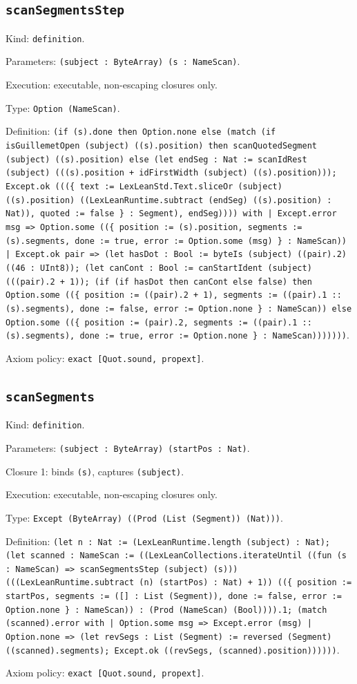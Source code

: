 \documentclass[11pt]{article}
\begin{document}
\subsection*{\texttt{scanSegmentsStep}}
\noindent Kind: \texttt{definition}.\par
\noindent Parameters: \texttt{(subject : ByteArray) (s : NameScan)}.\par
\noindent Execution: executable, non-escaping closures only.\par
\noindent Type: \texttt{Option (NameScan)}.\par
\noindent Definition: \texttt{(if (s).done then Option.none else (match (if isGuillemetOpen (subject) ((s).position) then scanQuotedSegment (subject) ((s).position) else (let endSeg : Nat := scanIdRest (subject) (((s).position + idFirstWidth (subject) ((s).position))); Except.ok (((\{ text := LexLeanStd.Text.sliceOr (subject) ((s).position) ((LexLeanRuntime.subtract (endSeg) ((s).position) : Nat)), quoted := false \} : Segment), endSeg)))) with | Except.error msg => Option.some ((\{ position := (s).position, segments := (s).segments, done := true, error := Option.some (msg) \} : NameScan)) | Except.ok pair => (let hasDot : Bool := byteIs (subject) ((pair).2) ((46 : UInt8)); (let canCont : Bool := canStartIdent (subject) (((pair).2 + 1)); (if (if hasDot then canCont else false) then Option.some ((\{ position := ((pair).2 + 1), segments := ((pair).1 :: (s).segments), done := false, error := Option.none \} : NameScan)) else Option.some ((\{ position := (pair).2, segments := ((pair).1 :: (s).segments), done := true, error := Option.none \} : NameScan)))))))}.\par
\noindent Axiom policy: \texttt{exact [Quot.sound, propext]}.\par
\subsection*{\texttt{scanSegments}}
\noindent Kind: \texttt{definition}.\par
\noindent Parameters: \texttt{(subject : ByteArray) (startPos : Nat)}.\par
\noindent Closure 1: binds \texttt{(s)}, captures \texttt{(subject)}.\par
\noindent Execution: executable, non-escaping closures only.\par
\noindent Type: \texttt{Except (ByteArray) ((Prod (List (Segment)) (Nat)))}.\par
\noindent Definition: \texttt{(let n : Nat := (LexLeanRuntime.length (subject) : Nat); (let scanned : NameScan := ((LexLeanCollections.iterateUntil ((fun (s : NameScan) => scanSegmentsStep (subject) (s))) (((LexLeanRuntime.subtract (n) (startPos) : Nat) + 1)) ((\{ position := startPos, segments := ([] : List (Segment)), done := false, error := Option.none \} : NameScan)) : (Prod (NameScan) (Bool)))).1; (match (scanned).error with | Option.some msg => Except.error (msg) | Option.none => (let revSegs : List (Segment) := reversed (Segment) ((scanned).segments); Except.ok ((revSegs, (scanned).position))))))}.\par
\noindent Axiom policy: \texttt{exact [Quot.sound, propext]}.\par
\end{document}
